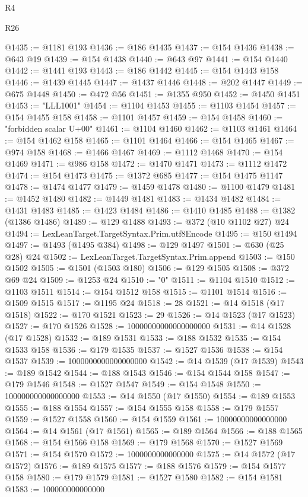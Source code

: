 \begin{lexlean}{R4}
\begin{lexlean}{R26}
\begin{coremodule}
{{{{{{{{{{{{{{{{{{{{{{{{{{{{{{{{{{{{{{{{{{{{{{{{{{{{{{{{{{{{{{{{{{{{{{{{@1435 := @1181 @193
@1436 := @186 @1435
@1437 := @154 @1436
@1438 := @643 @19
@1439 := @154 @1438
@1440 := @643 @97
@1441 := @154 @1440
@1442 := @1441 @193
@1443 := @186 @1442
@1445 := @154 @1443 @158
@1446 := @1439 @1445
@1447 := @1437 @1446
@1448 := @202 @1447
@1449 := @675 @1448
@1450 := @472 @56
@1451 := @1355 @950
@1452 := @1450 @1451
@1453 := "LLL1001"
@1454 := @1104 @1453
@1455 := @1103 @1454
@1457 := @154 @1455 @158
@1458 := @1101 @1457
@1459 := @154 @1458
@1460 := "forbidden scalar U+00"
@1461 := @1104 @1460
@1462 := @1103 @1461
@1464 := @154 @1462 @158
@1465 := @1101 @1464
@1466 := @154 @1465
@1467 := @974 @158
@1468 := @1466 @1467
@1469 := @1112 @1468
@1470 := @154 @1469
@1471 := @986 @158
@1472 := @1470 @1471
@1473 := @1112 @1472
@1474 := @154 @1473
@1475 := @1372 @685
@1477 := @154 @1475 @1147
@1478 := @1474 @1477
@1479 := @1459 @1478
@1480 := @1100 @1479
@1481 := @1452 @1480
@1482 := @1449 @1481
@1483 := @1434 @1482
@1484 := @1431 @1483
@1485 := @1423 @1484
@1486 := @1410 @1485
@1488 := @1382 (@1386 @1486)
@1489 := @129 @1488
@1493 := @372 (@10 @1102 @27) @24
@1494 := LexLeanTarget.TargetSyntax.Prim.utf8Encode
@1495 := @150 @1494
@1497 := @1493 (@1495 @384)
@1498 := @129 @1497
@1501 := @630 (@25 @28) @24
@1502 := LexLeanTarget.TargetSyntax.Prim.append
@1503 := @150 @1502
@1505 := @1501 (@1503 @180)
@1506 := @129 @1505
@1508 := @372 @69 @24
@1509 := @1253 @24
@1510 := "0"
@1511 := @1104 @1510
@1512 := @1103 @1511
@1514 := @154 @1512 @158
@1515 := @1101 @1514
@1516 := @1509 @1515
@1517 := @1195 @24
@1518 := 28
@1521 := @14 @1518 (@17 @1518)
@1522 := @170 @1521
@1523 := 29
@1526 := @14 @1523 (@17 @1523)
@1527 := @170 @1526
@1528 := 10000000000000000000
@1531 := @14 @1528 (@17 @1528)
@1532 := @189 @1531
@1533 := @188 @1532
@1535 := @154 @1533 @158
@1536 := @179 @1535
@1537 := @1527 @1536
@1538 := @154 @1537
@1539 := 1000000000000000000
@1542 := @14 @1539 (@17 @1539)
@1543 := @189 @1542
@1544 := @188 @1543
@1546 := @154 @1544 @158
@1547 := @179 @1546
@1548 := @1527 @1547
@1549 := @154 @1548
@1550 := 100000000000000000
@1553 := @14 @1550 (@17 @1550)
@1554 := @189 @1553
@1555 := @188 @1554
@1557 := @154 @1555 @158
@1558 := @179 @1557
@1559 := @1527 @1558
@1560 := @154 @1559
@1561 := 10000000000000000
@1564 := @14 @1561 (@17 @1561)
@1565 := @189 @1564
@1566 := @188 @1565
@1568 := @154 @1566 @158
@1569 := @179 @1568
@1570 := @1527 @1569
@1571 := @154 @1570
@1572 := 1000000000000000
@1575 := @14 @1572 (@17 @1572)
@1576 := @189 @1575
@1577 := @188 @1576
@1579 := @154 @1577 @158
@1580 := @179 @1579
@1581 := @1527 @1580
@1582 := @154 @1581
@1583 := 100000000000000
}}}}}}}}}}}}}}}}}}}}}}}}}}}}}}}}}}}}}}}}}}}}}}}}}}}}}}}}}}}}}}}}}}}}}}}}
\end{coremodule}
\end{lexlean}
\end{lexlean}

